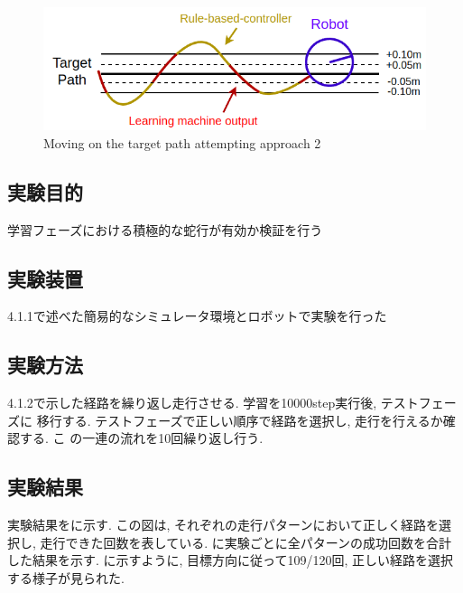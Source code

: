 \begin{figure}[hbtp]
  \centering
 \includegraphics[keepaspectratio, scale=0.58]
      {images/act1.5.png}
 \caption{Moving on the target path attempting approach 2}
 \label{Fig:act1.5}
\end{figure}

  \subsection{実験目的}
  学習フェーズにおける積極的な蛇行が有効か検証を行う
  \subsection{実験装置}
  4.1.1で述べた簡易的なシミュレータ環境とロボットで実験を行った
  \subsection{実験方法}
  4.1.2で示した経路を繰り返し走行させる. 学習を10000step実行後, テストフェーズに
  移行する. テストフェーズで正しい順序で経路を選択し, 走行を行えるか確認する. こ
  の一連の流れを10回繰り返し行う.
  \subsection{実験結果}
  実験結果をに示す. この図は, それぞれの走行パターンにおいて正しく経路を選択し, 走行できた回数を表している. に実験ごとに全パターンの成功回数を合計した結果を示す. 
  に示すように, 目標方向に従って109/120回, 正しい経路を選択する様子が見られた. 

